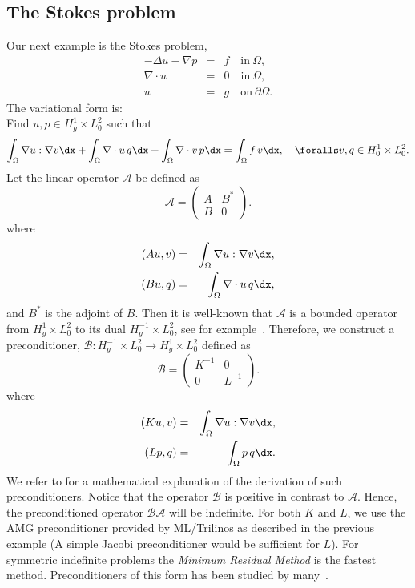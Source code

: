 \subsection{The Stokes problem}
Our next example is the Stokes problem,
\begin{eqnarray}
-\Delta u - \nabla p &=& f \quad \mbox{in} \ \Omega, \\
\nabla \cdot u &=& 0 \quad \mbox{in} \  \Omega, \\
             u &=& g   \quad \mbox{on} \  \partial \Omega.
\end{eqnarray}
The variational form is: \\
Find $u,p \in H^1_g \times L_0^2$ such that
\[
\int_\Omega \nabla u : \nabla v \dx +
\int_\Omega \nabla \cdot u \, q \dx +
\int_\Omega \nabla \cdot v \, p \dx = \int_\Omega f\, v \dx   , \quad
\foralls v,q \in H^1_0 \times L_0^2.
\]
Let the linear operator $\mathcal{A}$ be defined as
\[
\mathcal{A}  =
\begin{pmatrix} A & B^* \\ B & 0 \end{pmatrix}.
\]
where
\begin{eqnarray}
(A u, v) &=& \int_\Omega \nabla u : \nabla v \dx, \\
(B u, q) &=& \int_\Omega \nabla \cdot u \, q \dx,
\end{eqnarray}
and $B^*$ is the adjoint of $B$.  Then it is well-known that
$\mathcal{A}$ is a bounded operator from $H^1_g \times L_0^2$ to its
dual $H_g^{-1} \times L_0^2$, see for
example~\citet{Brezzi1974,BrezziFortin1991}. Therefore, we construct a
preconditioner, $\mathcal{B}: H_g^{-1} \times L_0^2 \rightarrow
H^1_g \times L_0^2$ defined as
\[
\mathcal{B}
=
\begin{pmatrix} K^{-1} & 0 \\ 0 & L^{-1} \end{pmatrix}.
\]
where
\begin{eqnarray}
(K u, v) &=& \int_\Omega \nabla u: \nabla v \dx, \\
(L p, q) &=& \int_\Omega p \, q \dx .
\end{eqnarray}
We refer to \citet{MardalWinther11} for a mathematical explanation of
the derivation of such preconditioners.  Notice that the operator
$\mathcal{B}$ is positive in contrast to $\mathcal{A}$. Hence, the
preconditioned operator $\mathcal{B} \mathcal{A}$ will be
indefinite. For both $K$ and $L$, we use the AMG preconditioner
provided by ML/Trilinos as described in the previous example (A simple
Jacobi preconditioner would be sufficient for $L$).  For symmetric
indefinite problems the \emph{Minimum Residual Method} is the fastest
method. Preconditioners of this form has been studied by
many~\citep{ElmanSilvesterWathen2005,RustenWinther1992,SilvesterWathen1993,SilvesterWathen1994}.


